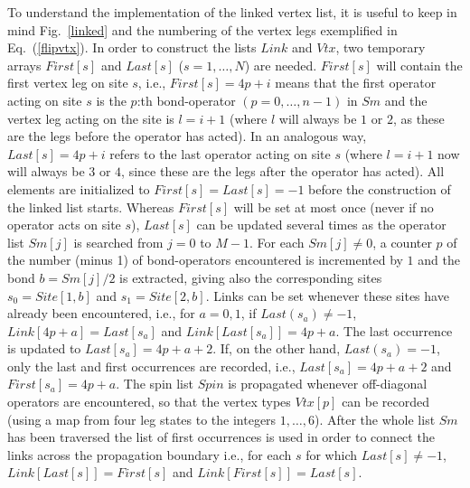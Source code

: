 \documentclass[10pt,pre,aps,twocolumn,showpacs,superscriptaddress,
floatfix]{revtex4}
\begin{document}
To understand the implementation of the linked vertex list, it is useful 
to keep in mind Fig.~\ref{linked} and the numbering of the vertex legs
exemplified in Eq.~(\ref{flipvtx}). In order to construct the lists $Link$ and
$Vtx$, two temporary arrays $First[s]$ and $Last[s]$ ($s=1,\ldots,N$) are 
needed. $First[s]$ will contain the first vertex leg on site $s$, i.e., 
$First[s]=4p+i$ means that the first operator acting on site $s$ is 
the $p$:th bond-operator $(p=0,\ldots ,n-1)$ in $Sm$ and the vertex leg acting
on the site is $l=i+1$ (where $l$ will always be  $1$ or $2$, as these are
the legs before the operator has acted). In an analogous way, $Last[s]=
4p+i$ refers to the last operator acting on site $s$ (where $l=i+1$
now will always be $3$ or $4$, since these are the legs after the operator 
has acted). All elements are initialized to $First[s]=Last[s]=-1$ before the 
construction of the linked list starts. Whereas $First[s]$ will be set at 
most once (never if no operator acts on site $s$), $Last[s]$ can be updated 
several times as the operator list $Sm[j]$ is searched from $j=0$ to $M-1$. 
For each $Sm[j]\not=0$, a counter $p$ of the number (minus 1) of 
bond-operators encountered is incremented by $1$ and the bond $b=Sm[j]/2$ is 
extracted, giving also the corresponding sites $s_0=Site[1,b]$ and 
$s_1=Site[2,b]$. Links can be set whenever these sites have already been 
encountered, i.e., for $a=0,1$, if $Last(s_a) \not=-1$, $Link[4p+a]=
Last[s_a]$ and $Link[Last[s_a]]=4p+a$. The last occurrence is updated to 
$Last[s_a]=4p+a+2$. If, on the other hand, $Last(s_a)=-1$, only the last 
and first occurrences are recorded, i.e., $Last[s_a]=4p+a+2$ and 
$First[s_a]=4p+a$. The spin list $Spin$ is propagated whenever 
off-diagonal operators are encountered, so that the vertex types $Vtx[p]$ 
can be recorded (using a map from four leg states to the integers 
$1,\ldots,6$). After the whole list $Sm$ has been traversed the list of first 
occurrences is used in order to connect the links across the propagation 
boundary  i.e., for each $s$ for which $Last[s] \not=-1$, $Link[Last[s]]=
First[s]$ and $Link[First[s]]=Last[s]$. 
\end{document}
